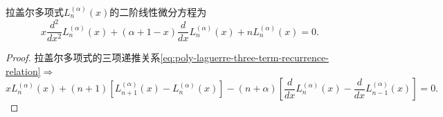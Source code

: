 \begin{subappendices}
\begin{theorem}[拉盖尔多项式的二阶线性微分方程]
  拉盖尔多项式$L_n^{(\alpha)}(x)$的二阶线性微分方程为
  \begin{equation*}
    \label{eq:poly-laguerre-linear-diff-equation}
    x \frac{d^2}{d x^2}L_n^{(\alpha)}(x)+ \left( \alpha + 1 - x \right) \frac{d}{dx}L_n^{(\alpha)}(x) + n  L_n^{(\alpha)}(x) = 0.
  \end{equation*}
\end{theorem}
\begin{proof}
  拉盖尔多项式的三项递推关系\eqref{eq:poly-laguerre-three-term-recurrence-relation}$\Rightarrow$
  \begin{equation*}
    x L_n^{(\alpha)}(x) + (n+1) \left[ L_{n+1}^{(\alpha)}(x) - L_n^{(\alpha)}(x)\right] - (n + \alpha)  \left[ \frac{d}{dx}L_n^{(\alpha)}(x) -  \frac{d}{dx}L_{n-1}^{(\alpha)}(x) \right]=0.
  \end{equation*}


\end{proof}
\end{subappendices}
